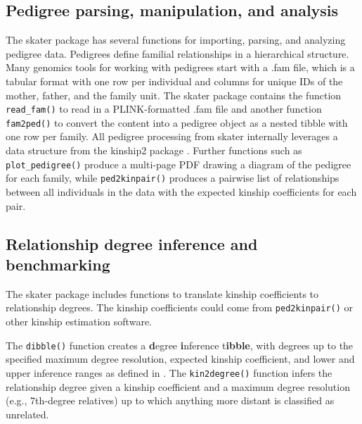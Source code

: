 \documentclass{bioinfo}
\begin{document}
\subsection{Pedigree parsing, manipulation, and analysis}

The skater package has several functions for importing, parsing, and
analyzing pedigree data. Pedigrees define familial relationships in a
hierarchical structure. Many genomics tools for working with pedigrees
start with a .fam file, which is a tabular format with one row per
individual and columns for unique IDs of the mother, father, and the
family unit. The skater package contains the function
\texttt{read\_fam()} to read in a PLINK-formatted .fam file and another
function \texttt{fam2ped()} to convert the content into a pedigree
object as a nested tibble with one row per family. All pedigree
processing from skater internally leverages a data structure from the
kinship2 package \citep{kinship2}. Further functions such as
\texttt{plot\_pedigree()} produce a multi-page PDF drawing a diagram of
the pedigree for each family, while \texttt{ped2kinpair()} produces a
pairwise list of relationships between all individuals in the data with
the expected kinship coefficients for each pair.

\subsection{Relationship degree inference and benchmarking}

The skater package includes functions to translate kinship coefficients
to relationship degrees. The kinship coefficients could come from
\texttt{ped2kinpair()} or other kinship estimation software.

The \texttt{dibble()} function creates a \textbf{d}egree
\textbf{i}nference t\textbf{ibble}, with degrees up to the specified
maximum degree resolution, expected kinship coefficient, and lower and
upper inference ranges as defined in \citet{manichaikul2010}. The
\texttt{kin2degree()} function infers the relationship degree given a
kinship coefficient and a maximum degree resolution (e.g., 7th-degree
relatives) up to which anything more distant is classified as unrelated.
\end{document}
